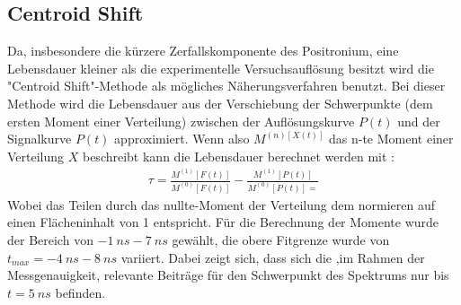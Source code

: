 \documentclass[a4paper,12pt]{article}
\begin{document}
\subsection{Centroid Shift}
Da, insbesondere die kürzere Zerfallskomponente des Positronium, eine Lebensdauer kleiner als die experimentelle Versuchsauflösung besitzt wird die "Centroid Shift"-Methode \cite{manual}
als mögliches Näherungsverfahren benutzt. Bei dieser Methode wird die Lebensdauer aus der Verschiebung der Schwerpunkte (dem ersten Moment einer Verteilung)
zwischen der Auflösungskurve $P(t)$ und der Signalkurve $P(t)$ approximiert.
Wenn also $M^{(n)[X(t)]}$ das n-te Moment einer Verteilung $X$ beschreibt kann die Lebensdauer berechnet werden mit \cite{manual} :
\begin{align*}
	\tau = \frac{M^{(1)}[F(t)]}{M^{(0)}[F(t)]} - \frac{M^{(1)}[P(t)]}{M^{(0)}[P(t)] = }
\end{align*}
Wobei das Teilen durch das nullte-Moment der Verteilung dem normieren auf einen Flächeninhalt von 1 entspricht.
Für die Berechnung der Momente wurde der Bereich von $\SI{-1}{ns} - \SI{7}{ns}$ gewählt, die obere Fitgrenze wurde von $t_{max}=\SI{-4}{ns} - \SI{8}{ns}$ variiert. Dabei zeigt sich, dass
sich die ,im Rahmen der Messgenauigkeit, relevante Beiträge für den Schwerpunkt des Spektrums nur bis  $t=\SI{5}{ns}$ befinden. 
\end{document}
